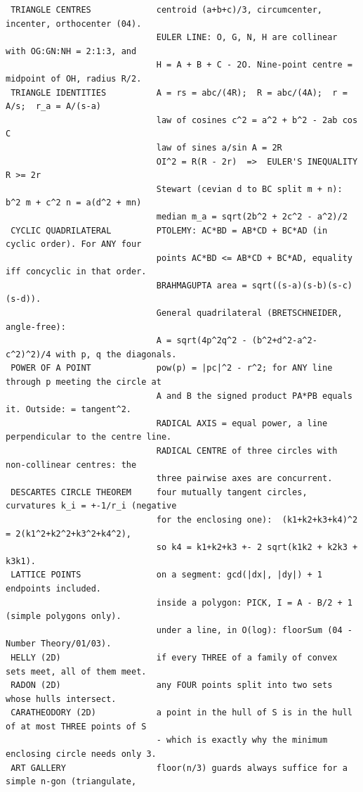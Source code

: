 \documentclass[9pt,a4paper,twocolumn]{extarticle}
\begin{document}
\begin{lstlisting}
 TRIANGLE CENTRES             centroid (a+b+c)/3, circumcenter, incenter, orthocenter (04).
                              EULER LINE: O, G, N, H are collinear with OG:GN:NH = 2:1:3, and
                              H = A + B + C - 2O. Nine-point centre = midpoint of OH, radius R/2.
 TRIANGLE IDENTITIES          A = rs = abc/(4R);  R = abc/(4A);  r = A/s;  r_a = A/(s-a)
                              law of cosines c^2 = a^2 + b^2 - 2ab cos C
                              law of sines a/sin A = 2R
                              OI^2 = R(R - 2r)  =>  EULER'S INEQUALITY R >= 2r
                              Stewart (cevian d to BC split m + n): b^2 m + c^2 n = a(d^2 + mn)
                              median m_a = sqrt(2b^2 + 2c^2 - a^2)/2
 CYCLIC QUADRILATERAL         PTOLEMY: AC*BD = AB*CD + BC*AD (in cyclic order). For ANY four
                              points AC*BD <= AB*CD + BC*AD, equality iff concyclic in that order.
                              BRAHMAGUPTA area = sqrt((s-a)(s-b)(s-c)(s-d)).
                              General quadrilateral (BRETSCHNEIDER, angle-free):
                              A = sqrt(4p^2q^2 - (b^2+d^2-a^2-c^2)^2)/4 with p, q the diagonals.
 POWER OF A POINT             pow(p) = |pc|^2 - r^2; for ANY line through p meeting the circle at
                              A and B the signed product PA*PB equals it. Outside: = tangent^2.
                              RADICAL AXIS = equal power, a line perpendicular to the centre line.
                              RADICAL CENTRE of three circles with non-collinear centres: the
                              three pairwise axes are concurrent.
 DESCARTES CIRCLE THEOREM     four mutually tangent circles, curvatures k_i = +-1/r_i (negative
                              for the enclosing one):  (k1+k2+k3+k4)^2 = 2(k1^2+k2^2+k3^2+k4^2),
                              so k4 = k1+k2+k3 +- 2 sqrt(k1k2 + k2k3 + k3k1).
 LATTICE POINTS               on a segment: gcd(|dx|, |dy|) + 1 endpoints included.
                              inside a polygon: PICK, I = A - B/2 + 1 (simple polygons only).
                              under a line, in O(log): floorSum (04 - Number Theory/01/03).
 HELLY (2D)                   if every THREE of a family of convex sets meet, all of them meet.
 RADON (2D)                   any FOUR points split into two sets whose hulls intersect.
 CARATHEODORY (2D)            a point in the hull of S is in the hull of at most THREE points of S
                              - which is exactly why the minimum enclosing circle needs only 3.
 ART GALLERY                  floor(n/3) guards always suffice for a simple n-gon (triangulate,

\end{lstlisting}
\end{document}
